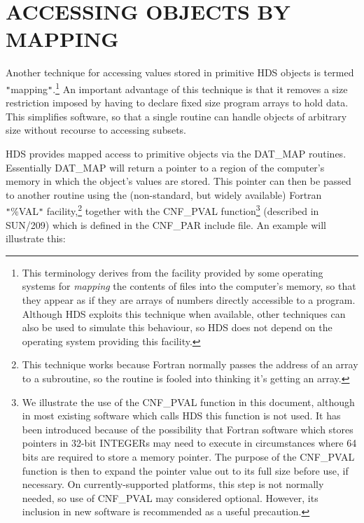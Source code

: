 \documentclass[11pt]{article}
\newcommand{\htmlref}[2]{#1}
\newcommand{\xref}[3]{#1}
\newcommand{\xlabel}[1]{}
\newcommand{\qt}[1]{``#1''}
\newcommand{\st}[1]{{\em{#1}}}
\renewcommand{\qt}[1]{{\tt{"}}#1{\tt{"}}}
\begin{document}
\section{\xlabel{mapping_data}\label{sect:mapping}ACCESSING OBJECTS BY MAPPING}

Another technique for accessing values stored in primitive HDS objects
is termed \qt{mapping}.\footnote{This terminology derives from the
facility provided by some operating systems for \st{mapping} the
contents of files into the computer's memory, so that they appear as
if they are arrays of numbers directly accessible to a
program. Although HDS exploits this technique when available, other
techniques can also be used to simulate this behaviour, so HDS does
not depend on the operating system providing this facility.} An
important advantage of this technique is that it removes a size
restriction imposed by having to declare fixed size program arrays to
hold data. This simplifies software, so that a single routine can
handle objects of arbitrary size without recourse to accessing
subsets.

HDS provides mapped access to primitive objects via the DAT\_MAP
routines. Essentially \htmlref{DAT\_MAP}{DAT_MAP} will return a
pointer to a region of the computer's memory in which the object's
values are stored. This pointer can then be passed to another routine
using the (non-standard, but widely available) Fortran \qt{\%VAL}
facility,\footnote{This technique works because Fortran normally
passes the address of an array to a subroutine, so the routine is
fooled into thinking it's getting an array.} together with the
\xref{CNF\_PVAL}{sun209}{CNF_PVAL} function\footnote{We illustrate the
use of the \xref{CNF\_PVAL}{sun209}{CNF_PVAL} function in this
document, although in most existing software which calls HDS this
function is not used. It has been introduced because of the
possibility that Fortran software which stores pointers in 32-bit
INTEGERs may need to execute in circumstances where 64 bits are
required to store a memory pointer. The purpose of the CNF\_PVAL
function is then to expand the pointer value out to its full size
before use, if necessary. On currently-supported platforms, this step
is not normally needed, so use of CNF\_PVAL may considered
optional. However, its inclusion in new software is recommended as a
useful precaution.} (described in \xref{SUN/209}{sun209}{}) which is
defined in the CNF\_PAR include file.  An example will illustrate
this:
\end{document}
